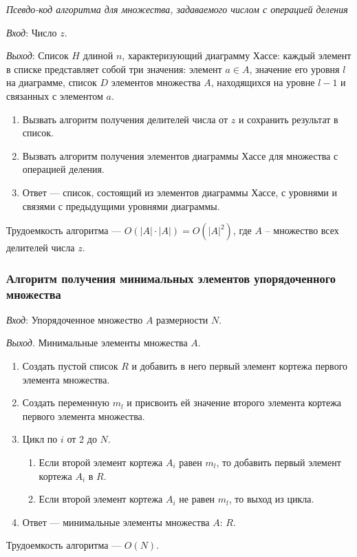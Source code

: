 \documentclass[bachelor, och, labwork]{shiza}
\begin{document}
\begin{center}\textit{Псевдо-код алгоритма для множества, задаваемого числом с операцией деления}\end{center}

\textit{Вход}: Число $z$.

\textit{Выход}: Список $H$ длиной $n$, характеризующий диаграмму Хассе: каждый 
элемент в списке представляет собой три значения: элемент $a \in A$, значение его 
уровня $l$ на диаграмме, список $D$ элементов множества $A$, находящихся на 
уровне $l - 1$ и связанных с элементом $a$.

\begin{enumerate}
    \item Вызвать алгоритм получения делителей числа от $z$ и сохранить результат в список.
    \item Вызвать алгоритм получения элементов диаграммы Хассе для множества с операцией деления.
    \item Ответ --- список, состоящий из элементов диаграммы Хассе, с уровнями 
    и связями с предыдущими уровнями диаграммы.
\end{enumerate}
Трудоемкость алгоритма --- $O(|A|\cdot|A|) = O(|A|^2)$, где $A$ -- множество всех
делителей числа $z$.

\subsubsection{Алгоритм получения минимальных элементов упорядоченного множества}

\textit{Вход}: Упорядоченное множество $A$ размерности $N$.

\textit{Выход.} Минимальные элементы множества $A$.
\begin{enumerate}
    \item Создать пустой список $R$ и добавить в него первый элемент кортежа
    первого элемента множества.
    \item Создать переменную $m_l$ и присвоить ей значение второго элемента кортежа
    первого элемента множества.
    \item Цикл по $i$ от 2 до $N$.
        \begin{enumerate}
            \item Если второй элемент кортежа $A_i$ равен $m_l$, то добавить
            первый элемент кортежа $A_i$ в $R$.
            \item Если второй элемент кортежа $A_i$ не равен $m_l$, то выход из цикла.
        \end{enumerate}
    \item Ответ --- минимальные элементы множества $A$: $R$.
\end{enumerate}
Трудоемкость алгоритма --- $O(N)$.
\end{document}
